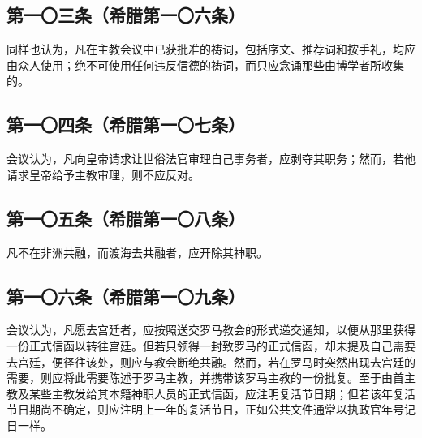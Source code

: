 
\subsection{第一〇三条（希腊第一〇六条）}

\par

同样也认为，凡在主教会议中已获批准的祷词，包括序文、推荐词和按手礼，均应由众人使用；绝不可使用任何违反信德的祷词，而只应念诵那些由博学者所收集的。\par


\subsection{第一〇四条（希腊第一〇七条）}

\par

会议认为，凡向皇帝请求让世俗法官审理自己事务者，应剥夺其职务；然而，若他请求皇帝给予主教审理，则不应反对。\par


\subsection{第一〇五条（希腊第一〇八条）}

\par

凡不在非洲共融，而渡海去共融者，应开除其神职。\par


\subsection{第一〇六条（希腊第一〇九条）}

\par

会议认为，凡愿去宫廷者，应按照送交罗马教会的形式递交通知，以便从那里获得一份正式信函以转往宫廷。但若只领得一封致罗马的正式信函，却未提及自己需要去宫廷，便径往该处，则应与教会断绝共融。然而，若在罗马时突然出现去宫廷的需要，则应将此需要陈述于罗马主教，并携带该罗马主教的一份批复。至于由首主教及某些主教发给其本籍神职人员的正式信函，应注明复活节日期；但若该年复活节日期尚不确定，则应注明上一年的复活节日，正如公共文件通常以执政官年号记日一样。\par

